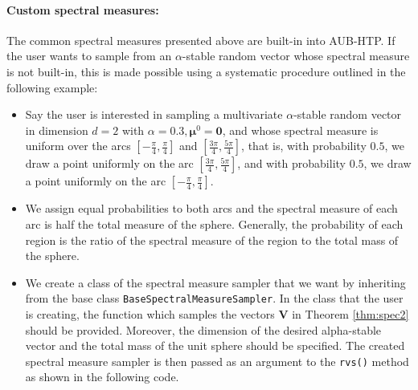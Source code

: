 \paragraph{Custom spectral measures:} The common spectral measures presented above are built-in into AUB-HTP. If the user wants to sample from an $\alpha$-stable random vector whose spectral measure is not built-in, this is made possible using a systematic procedure outlined in the following example:
\begin{itemize}

\item Say the user is interested in sampling a multivariate $\alpha$-stable random vector in dimension $d=2$ with $\alpha=0.3, \boldsymbol{\mu}^0=\mathbf{0}$, and whose spectral measure is uniform over the arcs $\left[-\frac{\pi}{4},\frac{\pi}{4}\right]$ and $\left[\frac{3\pi}{4},\frac{5\pi}{4}\right]$, that is, with probability $0.5$, we  draw a point uniformly on the arc $\left[\frac{3\pi}{4},\frac{5\pi}{4}\right]$, and with probability $0.5$, we draw a point uniformly on the arc $\left[-\frac{\pi}{4},\frac{\pi}{4}\right]$.

\item We assign equal probabilities to both arcs and the spectral measure of each arc is half the total measure of the sphere. Generally, the probability of each region is the ratio of the spectral measure of the region to the total mass of the sphere.

\item We create a class of the spectral measure sampler that we want by inheriting from the base class \texttt{BaseSpectralMeasureSampler}. In the class that the user is creating, the function which samples the vectors $\mathbf{V}$ in Theorem \ref{thm:spec2} should be provided. Moreover, the dimension of the desired alpha-stable vector and the total mass of the unit sphere should be specified. The created spectral measure sampler is then passed as an argument to the \texttt{rvs()} method as shown in the following code.
\end{itemize}


